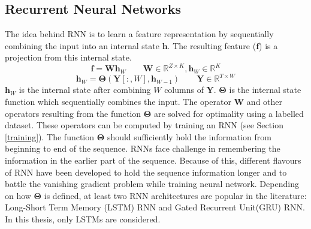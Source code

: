 \FloatBarrier

\subsection{Recurrent Neural Networks}
\label{rnn}
The idea behind RNN is to learn a feature representation by sequentially combining the input into an internal state $\textbf{h}$. The resulting feature ($\textbf{f}$) is a projection from this internal state.
\[ 
\textbf{f} = \textbf{W}\textbf{h}_{W} \qquad \textbf{W} \in \mathbb{R}^{Z \times K}, \textbf{h}_{W} \in \mathbb{R}^{K}
\]
\[
\textbf{h}_{W} = \bm{\Theta}(\textbf{Y}[:,W], \textbf{h}_{W-1}) \qquad \textbf{Y} \in \mathbb{R}^{T \times W}
\]
$\textbf{h}_{W}$ is the internal state after combining $W$ columns of $\textbf{Y}$. $\bm{\Theta}$ is the internal state function which sequentially combines the input. The operator $\textbf{W}$ and other operators resulting from the function $\bm{\Theta}$ are solved for optimality using a labelled dataset. These operators can be computed by training an RNN (see Section \ref{training}). The function $\bm{\Theta}$ should sufficiently hold the information from beginning to end of the sequence. RNNs face challenge in remembering the information in the earlier part of the sequence. Because of this, different flavours of RNN have been developed to hold the sequence information longer and to battle the vanishing gradient problem while training neural network. Depending on how $\bm{\Theta}$ is defined, at least two RNN architectures are popular in the literature: Long-Short Term Memory (LSTM) RNN and Gated Recurrent Unit(GRU) RNN. In this thesis, only LSTMs\cite{LSTM} are considered.   

